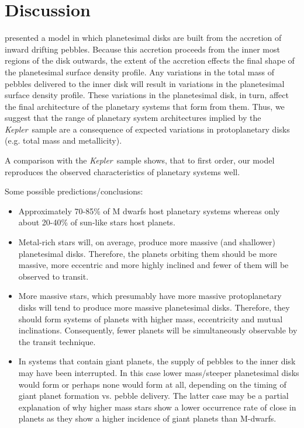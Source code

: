 \documentclass{emulateapj}
\def\kepler{{\slshape Kepler}}
\begin{document}
\section{Discussion}
\label{discussion}

\citet{Moriarty15} presented a model in which planetesimal disks are built from the accretion of inward drifting pebbles. Because this accretion proceeds from the inner most regions of the disk outwards, the extent of the accretion effects the final shape of the planetesimal surface density profile. Any variations in the total mass of pebbles delivered to the inner disk will result in variations in the planetesimal surface density profile. These variations in the planetesimal disk, in turn, affect the final architecture of the planetary systems that form from them. Thus, we suggest that the range of planetary system architectures implied by the \kepler\ sample are a consequence of expected variations in protoplanetary disks (e.g. total mass and metallicity).

A comparison with the \kepler\ sample shows, that to first order, our model reproduces the observed characteristics of planetary systems well. 

Some possible predictions/conclusions:

\begin{itemize}

\item Approximately 70-85\% of M dwarfs host planetary systems whereas only about 20-40\% of sun-like stars host planets.

\item Metal-rich stars will, on average, produce more massive (and shallower) planetesimal disks. Therefore, the planets orbiting them should be more massive, more eccentric and more highly inclined and fewer of them will be observed to transit.

\item More massive stars, which presumably have more massive protoplanetary disks \citep[e.g.][]{Andrews13} will tend to produce more massive planetesimal disks. Therefore, they should form systems of planets with higher mass, eccentricity and mutual inclinations. Consequently, fewer planets will be simultaneously observable by the transit technique.

\item In systems that contain giant planets, the supply of pebbles to the inner disk may have been interrupted. In this case lower mass/steeper planetesimal disks would form or perhaps none would form at all, depending on the timing of giant planet formation vs. pebble delivery. The latter case may be a partial explanation of why higher mass stars show a lower occurrence rate of close in planets as they show a higher incidence of giant planets than M-dwarfs.

\end{itemize}



\end{document}
